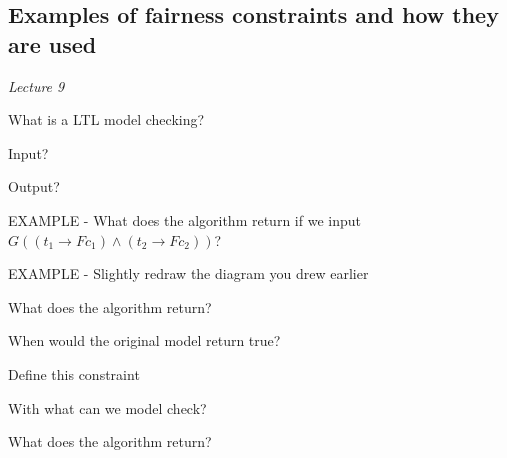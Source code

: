 \documentclass[fleqn]{article}
\begin{document}
\subsection{Examples of fairness constraints and how they are used}
\textit{Lecture 9}
\begin{enumerate}
    {\color{red}\item What is a LTL model checking?}
    \begin{itemize}
        {\color{blue}\item Input?}
        {\color{red}\item Output?}
    \end{itemize}
    {\color{red}\item EXAMPLE - What does the algorithm return if we input $G ((t_1 \rightarrow Fc_1) \wedge (t_2 \rightarrow Fc_2))$?}
    {\color{red}\item EXAMPLE - Slightly redraw the diagram you drew earlier}
    \begin{itemize}
        {\color{red}\item What does the algorithm return?}
        {\color{blue}\item When would the original model return true?}
        {\color{green}\item Define this constraint}
        {\color{green}\item With what can we model check?}
        {\color{red}\item What does the algorithm return?}
    \end{itemize}
\end{enumerate}
\end{document}

